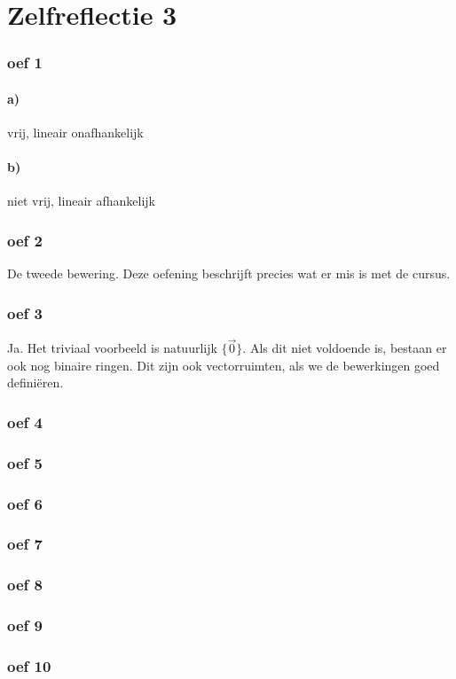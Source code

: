 \documentclass[lineaire_algebra_oplossingen.tex]{subfiles}
\begin{document}
\part{Zelfreflectie 3}
\section{oef 1}
\subsection*{a)}
vrij, lineair onafhankelijk
\subsection*{b)}
niet vrij, lineair afhankelijk
\section{oef 2}
De tweede bewering. Deze oefening beschrijft precies wat er mis is met de cursus.
\section{oef 3}
Ja. Het triviaal voorbeeld is natuurlijk $\{\vec{0}\}$. Als dit niet voldoende is, bestaan er ook nog binaire ringen. Dit zijn ook vectorruimten, als we de bewerkingen goed defini\"eren.
\section{oef 4}
\section{oef 5}
\section{oef 6}
\section{oef 7}
\section{oef 8}
\section{oef 9}
\section{oef 10}
\end{document}
